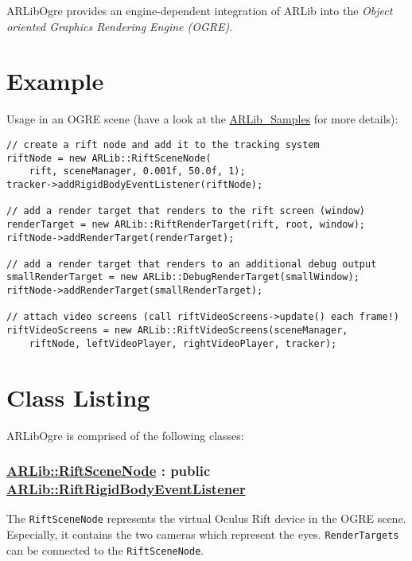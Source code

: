 ARLibOgre provides an engine-dependent integration of ARLib into the \emph{Object oriented Graphics Rendering Engine (OGRE)}\cite{ogre}.

\section{Example}\label{example}

Usage in an OGRE scene (have a look at the
\href{https://github.com/ands/OculusMeetsAR/tree/master/ARLib_Samples}{ARLib\_Samples}
for more details):

\begin{lstlisting}
// create a rift node and add it to the tracking system
riftNode = new ARLib::RiftSceneNode(
    rift, sceneManager, 0.001f, 50.0f, 1);
tracker->addRigidBodyEventListener(riftNode);

// add a render target that renders to the rift screen (window)
renderTarget = new ARLib::RiftRenderTarget(rift, root, window);
riftNode->addRenderTarget(renderTarget);

// add a render target that renders to an additional debug output
smallRenderTarget = new ARLib::DebugRenderTarget(smallWindow);
riftNode->addRenderTarget(smallRenderTarget);

// attach video screens (call riftVideoScreens->update() each frame!)
riftVideoScreens = new ARLib::RiftVideoScreens(sceneManager,
    riftNode, leftVideoPlayer, rightVideoPlayer, tracker);
\end{lstlisting}

\section{Class Listing}
ARLibOgre is comprised of the following classes:

\newpage
\subsubsection{\texorpdfstring{\href{https://github.com/ands/OculusMeetsAR/blob/master/ARLib/include/ARLib/Ogre/RiftSceneNode.h}{ARLib::RiftSceneNode}
: public
\href{https://github.com/ands/OculusMeetsAR/blob/master/ARLib/include/ARLib/Tracking/RigidBodyEventListener.h\#L33}{ARLib::RiftRigidBodyEventListener}}{ARLib::RiftSceneNode : public ARLib::RiftRigidBodyEventListener}}\label{arlibriftscenenode-public-arlibriftrigidbodyeventlistener}

The \texttt{RiftSceneNode} represents the virtual Oculus Rift device in the OGRE
scene. Especially, it contains the two cameras which represent the eyes.
\texttt{RenderTargets} can be connected to the \texttt{RiftSceneNode}.


